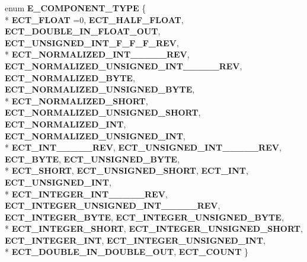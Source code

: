 \begin{DoxyCompactItemize}
\item 
enum {\bfseries E\+\_\+\+C\+O\+M\+P\+O\+N\+E\+N\+T\+\_\+\+T\+Y\+PE} \{ \\*
{\bfseries E\+C\+T\+\_\+\+F\+L\+O\+AT} =0, 
{\bfseries E\+C\+T\+\_\+\+H\+A\+L\+F\+\_\+\+F\+L\+O\+AT}, 
{\bfseries E\+C\+T\+\_\+\+D\+O\+U\+B\+L\+E\+\_\+\+I\+N\+\_\+\+F\+L\+O\+A\+T\+\_\+\+O\+UT}, 
{\bfseries E\+C\+T\+\_\+\+U\+N\+S\+I\+G\+N\+E\+D\+\_\+\+I\+N\+T\+\_\+F\+\_\+F\+\_\+F\+\_\+\+R\+EV}, 
\\*
{\bfseries E\+C\+T\+\_\+\+N\+O\+R\+M\+A\+L\+I\+Z\+E\+D\+\_\+\+I\+N\+T\+\_\+\_\+\_\+\_\+\_\+\+R\+EV}, 
{\bfseries E\+C\+T\+\_\+\+N\+O\+R\+M\+A\+L\+I\+Z\+E\+D\+\_\+\+U\+N\+S\+I\+G\+N\+E\+D\+\_\+\+I\+N\+T\+\_\+\_\+\_\+\_\+\_\+\+R\+EV}, 
{\bfseries E\+C\+T\+\_\+\+N\+O\+R\+M\+A\+L\+I\+Z\+E\+D\+\_\+\+B\+Y\+TE}, 
{\bfseries E\+C\+T\+\_\+\+N\+O\+R\+M\+A\+L\+I\+Z\+E\+D\+\_\+\+U\+N\+S\+I\+G\+N\+E\+D\+\_\+\+B\+Y\+TE}, 
\\*
{\bfseries E\+C\+T\+\_\+\+N\+O\+R\+M\+A\+L\+I\+Z\+E\+D\+\_\+\+S\+H\+O\+RT}, 
{\bfseries E\+C\+T\+\_\+\+N\+O\+R\+M\+A\+L\+I\+Z\+E\+D\+\_\+\+U\+N\+S\+I\+G\+N\+E\+D\+\_\+\+S\+H\+O\+RT}, 
{\bfseries E\+C\+T\+\_\+\+N\+O\+R\+M\+A\+L\+I\+Z\+E\+D\+\_\+\+I\+NT}, 
{\bfseries E\+C\+T\+\_\+\+N\+O\+R\+M\+A\+L\+I\+Z\+E\+D\+\_\+\+U\+N\+S\+I\+G\+N\+E\+D\+\_\+\+I\+NT}, 
\\*
{\bfseries E\+C\+T\+\_\+\+I\+N\+T\+\_\+\_\+\_\+\_\+\_\+\+R\+EV}, 
{\bfseries E\+C\+T\+\_\+\+U\+N\+S\+I\+G\+N\+E\+D\+\_\+\+I\+N\+T\+\_\+\_\+\_\+\_\+\_\+\+R\+EV}, 
{\bfseries E\+C\+T\+\_\+\+B\+Y\+TE}, 
{\bfseries E\+C\+T\+\_\+\+U\+N\+S\+I\+G\+N\+E\+D\+\_\+\+B\+Y\+TE}, 
\\*
{\bfseries E\+C\+T\+\_\+\+S\+H\+O\+RT}, 
{\bfseries E\+C\+T\+\_\+\+U\+N\+S\+I\+G\+N\+E\+D\+\_\+\+S\+H\+O\+RT}, 
{\bfseries E\+C\+T\+\_\+\+I\+NT}, 
{\bfseries E\+C\+T\+\_\+\+U\+N\+S\+I\+G\+N\+E\+D\+\_\+\+I\+NT}, 
\\*
{\bfseries E\+C\+T\+\_\+\+I\+N\+T\+E\+G\+E\+R\+\_\+\+I\+N\+T\+\_\+\_\+\_\+\_\+\_\+\+R\+EV}, 
{\bfseries E\+C\+T\+\_\+\+I\+N\+T\+E\+G\+E\+R\+\_\+\+U\+N\+S\+I\+G\+N\+E\+D\+\_\+\+I\+N\+T\+\_\+\_\+\_\+\_\+\_\+\+R\+EV}, 
{\bfseries E\+C\+T\+\_\+\+I\+N\+T\+E\+G\+E\+R\+\_\+\+B\+Y\+TE}, 
{\bfseries E\+C\+T\+\_\+\+I\+N\+T\+E\+G\+E\+R\+\_\+\+U\+N\+S\+I\+G\+N\+E\+D\+\_\+\+B\+Y\+TE}, 
\\*
{\bfseries E\+C\+T\+\_\+\+I\+N\+T\+E\+G\+E\+R\+\_\+\+S\+H\+O\+RT}, 
{\bfseries E\+C\+T\+\_\+\+I\+N\+T\+E\+G\+E\+R\+\_\+\+U\+N\+S\+I\+G\+N\+E\+D\+\_\+\+S\+H\+O\+RT}, 
{\bfseries E\+C\+T\+\_\+\+I\+N\+T\+E\+G\+E\+R\+\_\+\+I\+NT}, 
{\bfseries E\+C\+T\+\_\+\+I\+N\+T\+E\+G\+E\+R\+\_\+\+U\+N\+S\+I\+G\+N\+E\+D\+\_\+\+I\+NT}, 
\\*
{\bfseries E\+C\+T\+\_\+\+D\+O\+U\+B\+L\+E\+\_\+\+I\+N\+\_\+\+D\+O\+U\+B\+L\+E\+\_\+\+O\+UT}, 
{\bfseries E\+C\+T\+\_\+\+C\+O\+U\+NT}
 \}\hypertarget{namespaceirr_1_1scene_a44f149ca5d45d3c64b5187d7e509444d}{}\label{namespaceirr_1_1scene_a44f149ca5d45d3c64b5187d7e509444d}


\end{DoxyCompactItemize}
